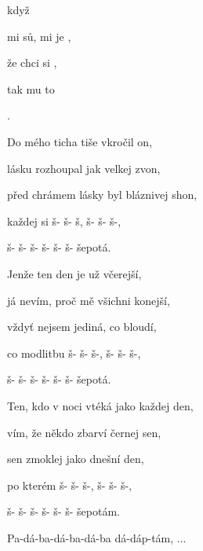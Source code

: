 

       

\zs
{}  když  

 mi sů,  mi je ,

 že  chci  si ,

tak mu to    

  .
\ks

\zs
Do mého ticha tiše vkročil on,

lásku rozhoupal jak velkej zvon,

před chrámem lásky byl bláznivej shon,

každej si š- š- š, š- š- š-,

š- š- š- š- š- š- šepotá.
\ks

\zs
Jenže ten den je už včerejší,

já nevím, proč mě všichni konejší,

vždyť nejsem jediná, co bloudí,

co modlitbu š- š- š-, š- š- š-,

š- š- š- š- š- š- šepotá.
\ks

\zs
Ten, kdo v noci vtéká jako každej den,

vím, že někdo zbarví černej sen,

sen zmoklej jako dnešní den,

po kterém š- š- š-, š- š- š-,

š- š- š- š- š- š- šepotám.
\ks

\zs
Pa-dá-ba-dá-ba-dá-ba dá-dáp-tám, ...
\ks

\kp





